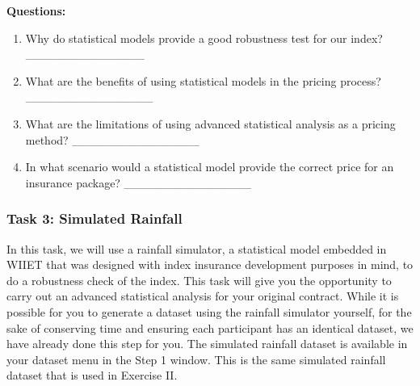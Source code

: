 \documentclass[letterpaper,10pt,english]{sphinxmanual}
\begin{document}
\textbf{Questions:}
\begin{enumerate}
\item {} 
Why do statistical models provide a good robustness test for our index? \_\_\_\_\_\_\_\_\_\_\_\_\_\_

\item {} 
What are the benefits of using statistical models in the pricing process? \_\_\_\_\_\_\_\_\_\_\_\_\_\_\_

\item {} 
What are the limitations of using advanced statistical analysis as a pricing method? \_\_\_\_\_\_\_\_\_\_\_\_\_\_\_

\item {} 
In what scenario would a statistical model provide the correct price for an insurance package? \_\_\_\_\_\_\_\_\_\_\_\_\_\_\_

\end{enumerate}


\subsubsection{Task 3: Simulated Rainfall}
\label{wiiet/wiiet_initialtomarketpricing_Web:task-3-simulated-rainfall}
In this task, we will use a rainfall simulator, a statistical model embedded in WIIET that was designed with index insurance development purposes in mind, to do a robustness check of the index. This task will give you the opportunity to carry out an advanced statistical analysis for your original contract. While it is possible for you to generate a dataset using the rainfall simulator yourself, for the sake of conserving time and ensuring each participant has an identical dataset, we have already done this step for you. The simulated rainfall dataset is available in your dataset menu in the Step 1 window. This is the same simulated rainfall dataset that is used in Exercise II.
\end{document}
